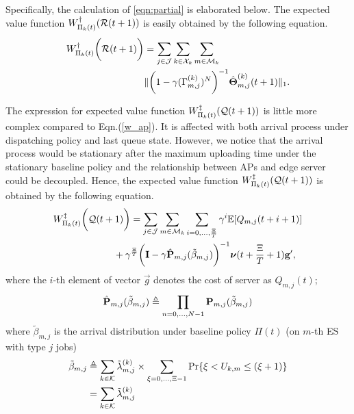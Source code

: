 Specifically, the calculation of \ref{eqn:partial} is elaborated below.
The expected value function $W^{\dagger}_{\Pi_{k}(t)}(\mathcal{R}(t+1))$ is easily obtained by the following equation.
\begin{align}
    W^{\dagger}_{\Pi_{k}(t)}\bigg(\mathcal{R}(t+1)\bigg) &= \sum_{j\in\mathcal{J}}\sum_{k\in\mathcal{X}_{k}}\sum_{m\in\mathcal{M}_{k}}
    \nonumber\\
    &\lVert
        \bigg( 1 - \gamma ({\Gamma}^{(k)}_{m,j})^{N} \bigg)^{-1} \hat{\boldsymbol{\Theta}}^{(k)}_{m,j}(t+1)
    \|_1.
    \label{w_ap}
\end{align}

The expression for expected value function $W^{\ddagger}_{\Pi_{k}(t)}(\mathcal{Q}(t+1))$ is little more complex compared to Eqn.(\ref{w_ap}).
It is affected with both arrival process under dispatching policy and last queue state.
However, we notice that the arrival process would be stationary after the maximum uploading time under the stationary baseline policy and the relationship between APs and edge server could be decoupled.
Hence, the expected value function $W^{\ddagger}_{\Pi_{k}(t)}(\mathcal{Q}(t+1))$ is obtained by the following equation.
\begin{align}
    &W^{\ddagger}_{\Pi_{k}(t)}\bigg(\mathcal{Q}(t+1)\bigg)
    = \sum_{j\in\mathcal{J}}\sum_{m\in\mathcal{M}_{k}}\sum_{i=0,\dots,\frac{\Xi}{T}} \gamma^{i} \mathbb{E}[ Q_{m,j}({t+i+1}) ]
    \nonumber\\
    &~~~~~~~~~~~~~~~~~~~+ \gamma^{\frac{\Xi}{T}} \bigg( \mathbf{I} - \gamma \hat{\mathbf{P}}_{m,j}(\tilde{\beta}_{m,j}) \bigg)^{-1} \boldsymbol{\nu}({t+\frac{\Xi}{T}+1}) \mathbf{g}',
\end{align}
where the $i$-th element of vector $\vec{g}$ denotes the cost of server as $Q_{m,j}(t)$;
\begin{align}
    \hat{\mathbf{P}}_{m,j}(\tilde{\beta}_{m,j}) \triangleq \prod_{n=0,\dots,N-1} \mathbf{P}_{m,j}(\tilde{\beta}_{m,j})
\end{align}
where $\tilde{\beta}_{m,j}$ is the arrival distribution under baseline policy $\Pi(t)$ (on $m$-th ES with type $j$ jobs)
\begin{align}
    \tilde{\beta}_{m,j} &\triangleq \sum_{k\in\mathcal{K}} \tilde{\lambda}^{(k)}_{m,j} \times \sum_{\xi=0,\dots,\Xi-1} \Pr\{ \xi<U_{k,m}\leq(\xi+1) \}
        \nonumber\\
    ~~~~&= \sum_{k\in\mathcal{K}} \tilde{\lambda}^{(k)}_{m,j}
\end{align}

